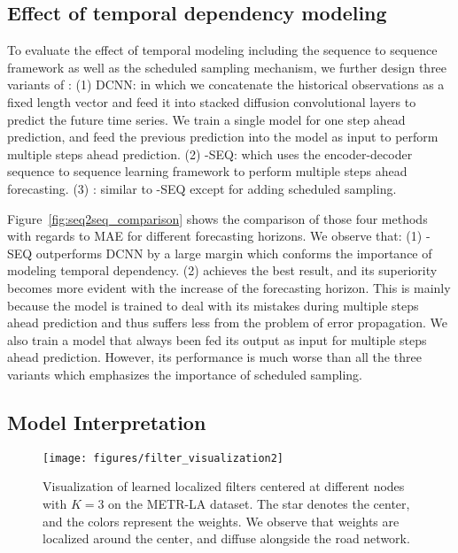 \subsection{Effect of temporal dependency modeling}

To evaluate the effect of temporal modeling including the sequence to sequence framework as well as the scheduled sampling mechanism, we further design three variants of \gcrnn{}: 
(1) DCNN: in which we concatenate the historical observations as a fixed length vector and feed it into stacked diffusion convolutional layers to predict the future time series.
We train a single model for one step ahead prediction, and feed the previous prediction into the model as input to perform multiple steps ahead prediction.
(2) \gcrnn{}-SEQ: which uses the encoder-decoder sequence to sequence learning framework to perform multiple steps ahead forecasting.
(3) \gcrnn{}: similar to \gcrnn{}-SEQ except for adding scheduled sampling.

Figure~\ref{fig:seq2seq_comparison} shows the comparison of those four methods with regards to MAE for different forecasting horizons. We observe that:
(1) \gcrnn{}-SEQ outperforms DCNN by a large margin which conforms the importance of modeling temporal dependency.
(2) \gcrnn{} achieves the best result, and its superiority becomes more evident with the increase of the forecasting horizon. 
This is mainly because the model is trained to deal with its mistakes during multiple steps ahead prediction and thus suffers less from the problem of error propagation. 
We also train a model that always been fed its output as input for multiple steps ahead prediction. However, its performance is much worse than all the three variants which emphasizes the importance of scheduled sampling.

\vspace{-0.1in}
\subsection{Model Interpretation}
\vspace{-0.1in}
\begin{figure*}[tp]
    \centering
	\texttt{[image: figures/filter\_visualization2]}
\caption{Visualization of learned localized filters centered at different nodes with $K=3$ on the METR-LA dataset. The star denotes the center, and the colors represent the weights. We observe that weights are localized around the center, and diffuse alongside the road network.}
	\label{fig:filter_visualization}
\end{figure*}

